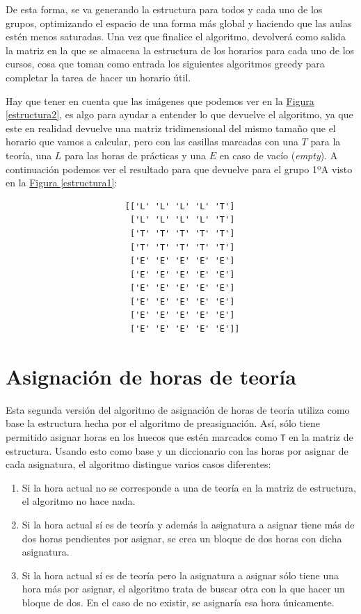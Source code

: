 De esta forma, se va generando la estructura para todos y cada uno de los grupos, optimizando el espacio de una forma más global y haciendo que las aulas estén menos saturadas. Una vez que finalice el algoritmo, devolverá como salida la matriz en la que se almacena la estructura de los horarios para cada uno de los cursos, cosa que toman como entrada los siguientes algoritmos greedy para completar la tarea de hacer un horario útil.

Hay que tener en cuenta que las imágenes que podemos ver en la \hyperref[estructura2]{Figura \ref*{estructura2}}, es algo para ayudar a entender lo que devuelve el algoritmo, ya que este en realidad devuelve una matriz tridimensional del mismo tamaño que el horario que vamos a calcular, pero con las casillas marcadas con una $T$ para la teoría, una $L$ para las horas de prácticas y una $E$ en caso de vacío (\textit{empty}). A continuación podemos ver el resultado para que devuelve para el grupo 1ºA visto en la \hyperref[estructura1]{Figura \ref*{estructura1}}:

\begin{verbatim}
                        [['L' 'L' 'L' 'L' 'T']
                         ['L' 'L' 'L' 'L' 'T']
                         ['T' 'T' 'T' 'T' 'T']
                         ['T' 'T' 'T' 'T' 'T']
                         ['E' 'E' 'E' 'E' 'E']
                         ['E' 'E' 'E' 'E' 'E']
                         ['E' 'E' 'E' 'E' 'E']
                         ['E' 'E' 'E' 'E' 'E']
                         ['E' 'E' 'E' 'E' 'E']
                         ['E' 'E' 'E' 'E' 'E']]
\end{verbatim}

\section{Asignación de horas de teoría}
Esta segunda versión del algoritmo de asignación de horas de teoría utiliza como base la estructura hecha por el algoritmo de preasignación. Así, sólo tiene permitido asignar horas en los huecos que estén marcados como \texttt{T} en la matriz de estructura. Usando esto como base y un diccionario con las horas por asignar de cada asignatura, el algoritmo distingue varios casos diferentes:

\begin{enumerate}[---]
  \item Si la hora actual no se corresponde a una de teoría en la matriz de estructura, el algoritmo no hace nada.
  \item Si la hora actual sí es de teoría y además la asignatura a asignar tiene más de dos horas pendientes por asignar, se crea un bloque de dos horas con dicha asignatura.
  \item Si la hora actual sí es de teoría pero la asignatura a asignar sólo tiene una hora más por asignar, el algoritmo trata de buscar otra con la que hacer un bloque de dos. En el caso de no existir, se asignaría esa hora únicamente.
\end{enumerate}

